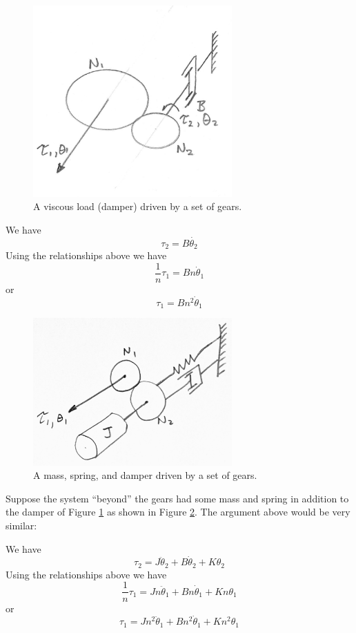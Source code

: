 \begin{figure}\centering
\includegraphics[width=3.0in]{figs03/00745a.png}
\caption{A viscous load (damper) driven by a set of gears.}\label{dampergears}
\end{figure}

We have
\[
\tau_2 = B \dot{\theta_2}
\]
Using the relationships above we have
\[
\frac{1}{n}\tau_1 = Bn\dot{\theta}_1
\]
or
\[
\tau_1 = Bn^2\dot{\theta}_1
\]


\begin{figure}\centering
\includegraphics[width=3.0in]{figs03/J14R59.png}
\caption{A mass, spring, and damper driven by a set of gears.}\label{dampermassspringgears}
\end{figure}


Suppose the system ``beyond'' the gears had some mass and spring in addition to the damper of Figure \ref{dampergears} as shown in Figure \ref{dampermassspringgears}. The argument above would be very similar:

We have
\[
\tau_2 = J \ddot{\theta}_2 + B \dot{\theta}_2 + K \theta_2
\]
Using the relationships above we have
\[
\frac{1}{n}\tau_1 =J n \ddot{\theta}_1 + B n\dot{\theta}_1 + K n\theta_1
\]
or
\[
\tau_1 =J n^2 \ddot{\theta}_1 + B n^2\dot{\theta}_1 + K n^2\theta_1
\]

